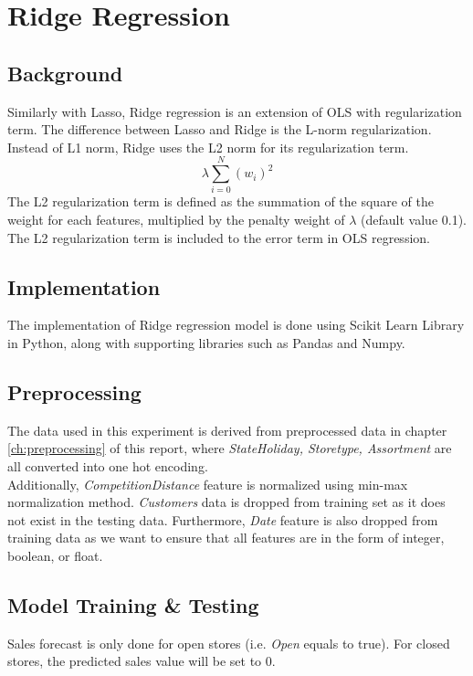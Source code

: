 \section{Ridge Regression} \label{sc:ridge}

\subsection{Background}
Similarly with Lasso, Ridge regression is an extension of OLS with regularization term. The difference between Lasso and Ridge is the L-norm regularization. Instead of L1 norm, Ridge uses the L2 norm for its regularization term.
\begin{equation}
\label{eq:l2_regularization}
\lambda \sum_{i=0}^{N} (w_i)^2
\end{equation}
The L2 regularization term is defined as the summation of the square of the weight for each features, multiplied by the penalty weight of $\lambda$ (default value 0.1). The L2 regularization term is included to the error term in OLS regression.

\subsection{Implementation}
The implementation of Ridge regression model is done using Scikit Learn Library in Python, along with supporting libraries such as Pandas and Numpy.

\subsection{Preprocessing}
The data used in this experiment is derived from preprocessed data in chapter \ref{ch:preprocessing} of this report, where \textit{StateHoliday, Storetype, Assortment} are all converted into one hot encoding.\\
Additionally, \textit{CompetitionDistance} feature is normalized using min-max normalization method. \textit{Customers} data is dropped from training set as it does not exist in the testing data. Furthermore, \textit{Date} feature is also dropped from training data as we want to ensure that all features are in the form of integer, boolean, or float.

\subsection{Model Training \& Testing}
Sales forecast is only done for open stores (i.e. \textit{Open} equals to true). For closed stores, the predicted sales value will be set to 0.

